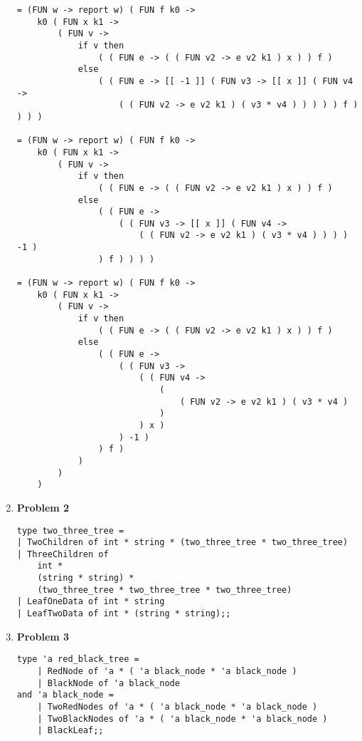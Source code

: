 \begin{enumerate}
\begin{lstlisting}
= (FUN w -> report w) ( FUN f k0 ->
    k0 ( FUN x k1 ->
        ( FUN v ->
            if v then
                ( ( FUN e -> ( ( FUN v2 -> e v2 k1 ) x ) ) f )
            else
                ( ( FUN e -> [[ -1 ]] ( FUN v3 -> [[ x ]] ( FUN v4 ->
                    ( ( FUN v2 -> e v2 k1 ) ( v3 * v4 ) ) ) ) ) f ) ) ) )

= (FUN w -> report w) ( FUN f k0 ->
    k0 ( FUN x k1 ->
        ( FUN v ->
            if v then
                ( ( FUN e -> ( ( FUN v2 -> e v2 k1 ) x ) ) f )
            else
                ( ( FUN e ->
                    ( ( FUN v3 -> [[ x ]] ( FUN v4 -> 
                    	( ( FUN v2 -> e v2 k1 ) ( v3 * v4 ) ) ) ) -1 )
                ) f ) ) ) )

= (FUN w -> report w) ( FUN f k0 ->
    k0 ( FUN x k1 ->
        ( FUN v ->
            if v then
                ( ( FUN e -> ( ( FUN v2 -> e v2 k1 ) x ) ) f )
            else
                ( ( FUN e ->
                    ( ( FUN v3 ->
                        ( ( FUN v4 ->
                            (
                                ( FUN v2 -> e v2 k1 ) ( v3 * v4 )
                            )
                        ) x )
                    ) -1 )
                ) f )
            )
        )
    )	
    \end{lstlisting}
	
	\item[]{\textbf{Problem 2}}
	
	\begin{lstlisting}
type two_three_tree =
| TwoChildren of int * string * (two_three_tree * two_three_tree)
| ThreeChildren of 
	int * 
	(string * string) * 
	(two_three_tree * two_three_tree * two_three_tree)
| LeafOneData of int * string
| LeafTwoData of int * (string * string);;
	\end{lstlisting}
	
	\item[]{\textbf{Problem 3}}
	
	\begin{lstlisting}
type 'a red_black_tree =
    | RedNode of 'a * ( 'a black_node * 'a black_node )
    | BlackNode of 'a black_node
and 'a black_node =
    | TwoRedNodes of 'a * ( 'a black_node * 'a black_node )
    | TwoBlackNodes of 'a * ( 'a black_node * 'a black_node )
    | BlackLeaf;;
   	\end{lstlisting}

\end{enumerate}



